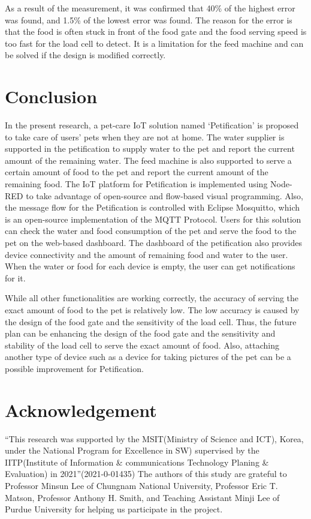 \documentclass[conference]{IEEEtran}
\begin{document}
As a result of the measurement, it was confirmed that 40\% of the highest error was found, and 1.5\% of the lowest error was found. The reason for the error is that the food is often stuck in front of the food gate and the food serving speed is too fast for the load cell to detect. It is a limitation for the feed machine and can be solved if the design is modified correctly.

\section{Conclusion}
In the present research, a pet-care IoT solution named ‘Petification’ is proposed to take care of users’ pets when they are not at home. The water supplier is supported in the petification to supply water to the pet and report the current amount of the remaining water. The feed machine is also supported to serve a certain amount of food to the pet and report the current amount of the remaining food. The IoT platform for Petification is implemented using Node-RED to take advantage of open-source and flow-based visual programming. Also, the message flow for the Petification is controlled with Eclipse Mosquitto, which is an open-source implementation of the MQTT Protocol. Users for this solution can check the water and food consumption of the pet and serve the food to the pet on the web-based dashboard. The dashboard of the petification also provides device connectivity and the amount of remaining food and water to the user. When the water or food for each device is empty, the user can get notifications for it.

While all other functionalities are working correctly, the accuracy of serving the exact amount of food to the pet is relatively low. The low accuracy is caused by the design of the food gate and the sensitivity of the load cell. Thus, the future plan can be enhancing the design of the food gate and the sensitivity and stability of the load cell to serve the exact amount of food. Also, attaching another type of device such as a device for taking pictures of the pet can be a possible improvement for Petification.

\section{Acknowledgement}
“This research was supported by the MSIT(Ministry of Science and ICT), Korea, under the National Program for Excellence in SW) supervised by the IITP(Institute of Information \& communications Technology Planing \& Evaluation) in 2021”(2021-0-01435)
The authors of this study are grateful to Professor Minsun Lee of Chungnam National University, Professor Eric T. Matson, Professor Anthony H. Smith, and Teaching Assistant Minji Lee of Purdue University for helping us participate in the project.
\end{document}
